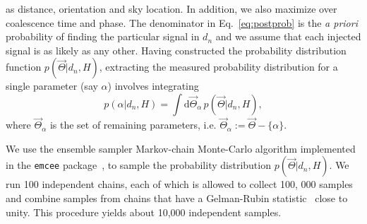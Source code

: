 \documentclass[aps,prd,amsmath,floats,floatfix, twocolumn,
superscriptaddress,nofootinbib,showpacs]{revtex4-1}
\newcommand{\D}{\mathrm{d}}
\newcommand{\lambdans}{\Lambda_\mathrm{NS}}
\newcommand{\chibh}{\chi_\mathrm{BH}}
\begin{document}
as distance, orientation and sky location. In addition, we also maximize over
coalescence time and phase.
The denominator in Eq.~\ref{eq:postprob} is the {\it a priori} probability of finding
the particular signal in $d_n$ and we assume that each injected signal is as
likely as any other. Having constructed the probability distribution function
$p(\vec{\Theta} | d_n, H)$, extracting the measured probability distribution
for a single parameter (say $\alpha$) involves integrating
\begin{equation}\label{eq:marginalize}
 p(\alpha | d_n, H) = \int\D \vec{\Theta}_\alpha\, p(\vec{\Theta} | d_n, H),
\end{equation}
where $\vec{\Theta}_\alpha$ is the set of remaining parameters, i.e.
$\vec{\Theta}_\alpha:=\vec{\Theta} - \{\alpha\}$.

We use the ensemble sampler Markov-chain Monte-Carlo algorithm implemented in
the {\tt emcee} package~\cite{emcee}, to sample the probability distribution 
$p(\vec{\Theta} | d_n, H)$. We run 100 independent chains, each of which is
allowed to collect 100, 000 samples and combine samples from chains that have
a Gelman-Rubin statistic~\cite{gelman1992} close to unity. This procedure yields
about 10,000 independent samples.
% 
% 
\end{document}
